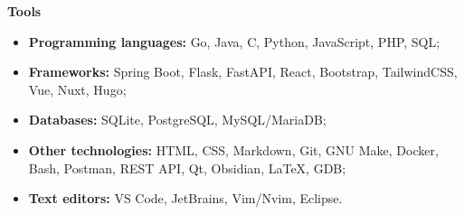 {\vspace{0.5cm} \hspace{-0.5cm} \Large \textbf{Tools}}

\begin{itemize}
    \item \textbf{Programming languages:} Go, Java, C, Python, JavaScript, PHP, SQL;
    \item \textbf{Frameworks:} Spring Boot, Flask, FastAPI, React, Bootstrap, TailwindCSS, Vue, Nuxt, Hugo;
    \item \textbf{Databases:} SQLite, PostgreSQL, MySQL/MariaDB;
    \item \textbf{Other technologies:} HTML, CSS, Markdown, Git, GNU Make, Docker, Bash, Postman,
        REST API, Qt, Obsidian, LaTeX, GDB;
    \item \textbf{Text editors:} VS Code, JetBrains, Vim/Nvim, Eclipse.
\end{itemize}
